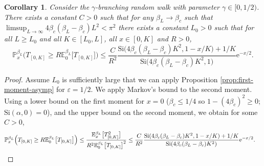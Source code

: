 \documentclass[a4paper, a4wide, 10pt, reqno]{amsart}
\theoremstyle{plain}
\newtheorem{corollary}[theorem]{Corollary}
\theoremstyle{definition}
\numberwithin{equation}{section}
\newcommand{\E}{\mathbb E}
\newcommand{\Prob}{\mathbb{P}}
\newcommand{\re}{{\mathrm e}}
\newcommand{\Si}{{\mathrm{Si}}}
\begin{document}
\begin{corollary}\label{cor:upper}
Consider the $\gamma$-branching random walk with parameter $\gamma\in[0,1/2)$. There exists a constant $C>0$ such that for any  $\beta_L\to\beta_c$ such that $\limsup_{L\to\infty}4\beta_c(\beta_L-\beta_c) L^2<\pi^2$ there exists a constant $L_0>0$ such that for all $L\ge L_0$ and all $K\in[L_0, L]$, all $x\in[0, K]$ and $R>0$, 
\begin{equation}\label{eq:progeny-markov}
\Prob_x^{\beta_L}\Big(T_{[0,K]}\ge R \E_0^{\beta_L}\big[T_{[0,K]}\big]\Big) \le \frac{C}{R^2}\frac{\Si\big(4\beta_c(\beta_L-\beta_c) K^2, 1-x/ K\big)+1/ K}{\Si\big(4\beta_c(\beta_L-\beta_c) K^2,1\big)}\re^{-x/2}.
    \end{equation}
\end{corollary}
\begin{proof} Assume $L_0$ is sufficiently large that we can apply Proposition \ref{prop:first-moment-asymp} for $\varepsilon=1/2$. 
We apply Markov's bound to the second moment. Using a lower bound on the first moment for $x=0$ ($\beta_c\le 1/4$ so $1-(4\beta_c)^2\ge 0$; $\Si(\alpha, 0)=0$), and the upper bound on the second moment, we obtain for some $C>0$,
    \begin{align}
        \Prob_x^{\beta_L}\Big(T_{[0, K]}\ge R \E_0^{\beta_L}\big[T_{[0, K]}\big]\Big)&\le 
        \frac{\E_x^{\beta_L}\big[T_{[0, K]}^2\big]}{R^2\E_0^{\beta_L}\big[T_{[0,
        K]}\big]^2}\nonumber\le \frac{C}{R^2}
        \frac{\Si(4\beta_c(\beta_L-\beta_c)K^2, 1-x/ K)+1/ K}{\Si(4\beta_c(\beta_L-\beta_c)K^2)}\re^{-x/2}.\nonumber\qedhere
    \end{align}
    \end{proof}
\end{document}
